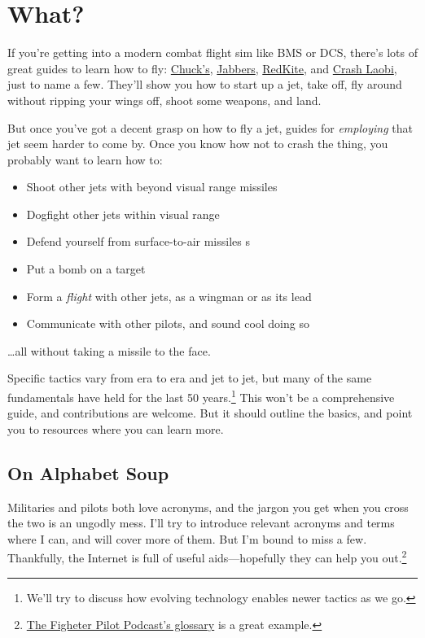 \chapter{What?}

If you're getting into a modern combat flight sim like BMS or DCS,
there's lots of great guides to learn how to fly:
\href{https://www.mudspike.com/chucks-guides/}{Chuck's},
\href{https://www.youtube.com/channel/UCvXXUrGCF3wV3bbZ6pFQ00g}{Jabbers},
\href{https://www.youtube.com/user/RedKiteRender}{RedKite},
and
\href{https://www.youtube.com/channel/UCqH078Ef0HENo01LF3xwIvA}{Crash Laobi},
just to name a few.
They'll show you how to start up a jet, take off, fly around
without ripping your wings off, shoot some weapons, and land.

But once you've got a decent grasp on how to fly a jet,
guides for \emph{employing} that jet seem harder to come by.
Once you know how not to crash the thing, you probably want to learn how to:
\begin{itemize}
\item Shoot other jets with beyond visual range  missiles
\item Dogfight other jets within visual range 
\item Defend yourself from surface-to-air missiles s
\item Put a bomb on a target
\item Form a \emph{flight} with other jets, as a wingman or as its lead
\item Communicate with other pilots, and sound cool doing so
\end{itemize}
\dots all without taking a missile to the face.

Specific tactics vary from era to era and jet to jet,
but many of the same fundamentals have held for the last 50
years.\punckern\footnote{We'll try to discuss how evolving technology
enables newer tactics as we go.}
This won't be a comprehensive guide,
and contributions are welcome.
But it should outline the basics, and point you to resources where you can
learn more.

\section{On Alphabet Soup}

Militaries and pilots both love acronyms,
and the jargon you get when you cross the two is an ungodly mess.
I'll try to introduce relevant acronyms and terms where I can,
and  will cover more of them.
But I'm bound to miss a few.
Thankfully, the Internet is full of useful aids---hopefully they can help you
out.\punckern\footnote{%
\href{https://www.fighterpilotpodcast.com/glossary/}{The Figheter Pilot Podcast's glossary}
is a great example.}
